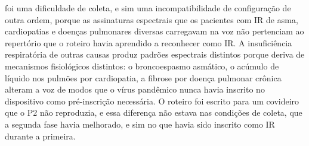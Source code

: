 foi uma dificuldade de coleta, e sim uma incompatibilidade de configuração de outra ordem, porque as assinaturas espectrais que os pacientes com IR de asma, cardiopatias e doenças pulmonares diversas carregavam na voz não pertenciam ao repertório que o roteiro havia aprendido a reconhecer como IR. A insuficiência respiratória de outras causas produz padrões espectrais distintos porque deriva de mecanismos fisiológicos distintos: o broncoespasmo asmático, o acúmulo de líquido nos pulmões por cardiopatia, a fibrose por doença pulmonar crônica alteram a voz de modos que o vírus pandêmico nunca havia inscrito no dispositivo como pré-inscrição necessária. O roteiro foi escrito para um covideiro que o P2 não reproduzia, e essa diferença não estava nas condições de coleta, que a segunda fase havia melhorado, e sim no que havia sido inscrito como IR durante a primeira.

